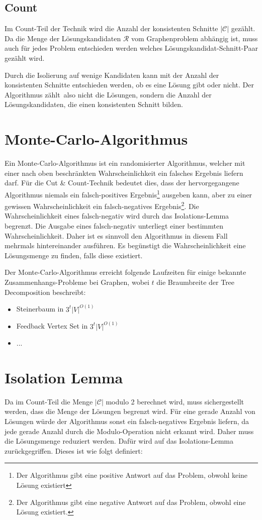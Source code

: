 \subsection{Count}
\label{ssec:cc_count}
Im Count-Teil der Technik wird die Anzahl der konsistenten Schnitte $|\mathcal{C}|$ gezählt.
Da die Menge der Lösungskandidaten $\mathcal{R}$ vom Graphenproblem abhängig ist, muss auch für jedes Problem entschieden werden welches Lösungskandidat-Schnitt-Paar gezählt wird.

Durch die Isolierung auf wenige Kandidaten kann mit der Anzahl der konsistenten Schnitte entschieden werden, ob es eine Lösung gibt oder nicht.
Der Algorithmus \glqq zählt\grqq ~also nicht die Lösungen, sondern die Anzahl der Lösungskandidaten, die einen konsistenten Schnitt bilden.

\section{Monte-Carlo-Algorithmus}
\label{sec:cc_monte}
Ein Monte-Carlo-Algorithmus ist ein randomisierter Algorithmus, welcher mit einer nach oben beschränkten Wahrscheinlichkeit ein falsches Ergebnis liefern darf. 
Für die Cut \& Count-Technik bedeutet dies, dass der hervorgegangene Algorithmus niemals ein falsch-positives Ergebnis\footnote{Der Algorithmus gibt eine positive Antwort auf das Problem, obwohl keine Lösung existiert} ausgeben kann, aber zu einer gewissen Wahrscheinlichkeit ein falsch-negatives Ergebnis\footnote{Der Algorithmus gibt eine negative Antwort auf das Problem, obwohl eine Lösung existiert.}. 
Die Wahrscheinlichkeit eines falsch-negativ wird durch das Isolations-Lemma begrenzt. 
Die Ausgabe eines falsch-negativ unterliegt einer bestimmten Wahrscheinlichkeit. Daher ist es sinnvoll den Algorithmus in diesem Fall mehrmals hintereinander ausführen. Es begünstigt die Wahrscheinlichkeit eine Lösungsmenge zu finden, falls diese existiert.

Der Monte-Carlo-Algorithmus erreicht folgende Laufzeiten für einige bekannte Zusammenhangs-Probleme bei Graphen, wobei $t$ die Braumbreite der Tree Decomposition beschreibt:
\begin{itemize}
\item Steinerbaum in $3^t |V|^{O(1)}$
\item Feedback Vertex Set in $3^t|V|^{O(1)}$
\item ...
\end{itemize}

\section{Isolation Lemma}
\label{sec:cc_iso}
Da im Count-Teil die Menge $|\mathcal{C}|$ modulo 2 berechnet wird, muss sichergestellt werden, dass die Menge der Lösungen begrenzt wird. 
Für eine gerade Anzahl von Lösungen würde der Algorithmus sonst ein falsch-negatives Ergebnis liefern, da jede gerade Anzahl durch die Modulo-Operation nicht erkannt wird. 
Daher muss die Lösungsmenge reduziert werden. Dafür wird auf das Isolations-Lemma zurückgegriffen. Dieses ist wie folgt definiert:

